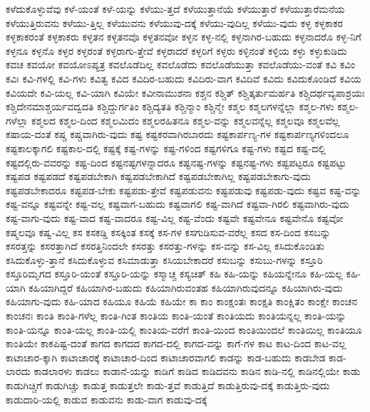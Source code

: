 {ಕಳೆದುಕೊಳ್ಳುವೆವು
ಕಳೆ-ಯಂತೆ
ಕಳೆ-ಯನ್ನು
ಕಳೆಯು-ತ್ತದೆ
ಕಳೆಯುತ್ತಾನೆಯೆ
ಕಳೆಯುತ್ತಾರೆ
ಕಳೆಯುತ್ತಾರೆಮನೆಯ
ಕಳೆಯುತ್ತಿರುವನು
ಕಳೆಯು-ತ್ತಿಲ್ಲ
ಕಳೆಯುವನು
ಕಳೆಯುವು-ದಕ್ಕೆ
ಕಳೆಯು-ವುದಿಲ್ಲ
ಕಳೆಯು-ವುದು
ಕಳ್ಳ
ಕಳ್ಳಕಾಕರ
ಕಳ್ಳಕಾಕರಂತೆ
ಕಳ್ಳಕಾಕರು
ಕಳ್ಳತನ
ಕಳ್ಳತನವೊ
ಕಳ್ಳತನವೋ
ಕಳ್ಳನ
ಕಳ್ಳ-ನಲ್ಲಿ
ಕಳ್ಳನಾಗಿರ-ಬಹುದು
ಕಳ್ಳನಾದರೊ
ಕಳ್ಳ-ನಿಗೆ
ಕಳ್ಳನೂ
ಕಳ್ಳನೊ
ಕಳ್ಳರ
ಕಳ್ಳರಂತೆ
ಕಳ್ಳರಾಗು-ತ್ತೇವೆ
ಕಳ್ಳರಾದರೆ
ಕಳ್ಳರಿಗೆ
ಕಳ್ಳರು
ಕಳ್ಳಿನಂತೆ
ಕಳ್ಳಿಯ
ಕಳ್ಳು
ಕಳ್ಳುಕುಡಿದು
ಕವಚ
ಕವಯೋ
ಕವಯೋಽಪ್ಯತ್ರ
ಕವಲೊಡೆದಿಲ್ಲ
ಕವಲೊಡೆದು
ಕವಲೊಡೆಯುತ್ತಾ
ಕವಲೊಡೆಯು-ವಂತೆ
ಕವಿ
ಕವಿಂ
ಕವಿಃ
ಕವಿ-ಗಳಲ್ಲಿ
ಕವಿ-ಗಳು
ಕವಿತ್ವ
ಕವಿದ
ಕವಿದಿರ-ಬಹುದು
ಕವಿದಿರು-ವಾಗ
ಕವಿದಿವೆ
ಕವಿದು
ಕವಿದುಕೊಂಡಿದೆ
ಕವಿಯ
ಕವಿಯದೇ
ಕವಿ-ಯಲ್ಲ
ಕವಿ-ಯಾಗಿ
ಕವಿಯೇ
ಕವೀನಾಮುಶನಾ
ಕಶ್ಚನ
ಕಶ್ಚಿತ್
ಕಶ್ಚಿತ್ಕರ್ತುಮರ್ಹತಿ
ಕಶ್ಚಿದರ್ಥವ್ಯಪಾಶ್ರಯಃ
ಕಶ್ಚಿದೇನಮಾಶ್ಚರ್ಯವದ್ವದತಿ
ಕಶ್ಚಿದ್ದುರ್ಗತಿಂ
ಕಶ್ಚಿದ್ಯತತಿ
ಕಶ್ಚಿನ್ಮಾಂ
ಕಶ್ಚಿನ್ಮೇ
ಕಶ್ಮಲ
ಕಶ್ಮಲಗಳನ್ನೆಲ್ಲಾ
ಕಶ್ಮಲ-ಗಳು
ಕಶ್ಮಲ-ಗಳೆಲ್ಲಾ
ಕಶ್ಮಲದ
ಕಶ್ಮಲ-ದಿಂದ
ಕಶ್ಮಲಮಿದಂ
ಕಶ್ಮಲರಹಿತನೂ
ಕಶ್ಮಲ-ವನ್ನು
ಕಶ್ಮಲವನ್ನೆಲ್ಲ
ಕಶ್ಮಲವೂ
ಕಶ್ಮಲವೆಲ್ಲ
ಕಷಾಯ-ದಂತೆ
ಕಷ್ಚ
ಕಷ್ಚವಾಗಿರು-ವುದು
ಕಷ್ಟ
ಕಷ್ಟಕರವಾಗಿರಬಾರದು
ಕಷ್ಟಕಾರ್ಪಣ್ಯ-ಗಳ
ಕಷ್ಟಕಾರ್ಪಣ್ಯಗಳಿಂದಲೂ
ಕಷ್ಟಕಾಲಕ್ಕಾಗಲಿ
ಕಷ್ಟಕಾಲ-ದಲ್ಲಿ
ಕಷ್ಟಕ್ಕೆ
ಕಷ್ಟ-ಗಳನ್ನು
ಕಷ್ಟ-ಗಳಿಂದ
ಕಷ್ಟಗಳಿಗೂ
ಕಷ್ಟ-ಗಳು
ಕಷ್ಟದ
ಕಷ್ಟ-ದಲ್ಲಿ
ಕಷ್ಟದಲ್ಲಿರು-ವವರನ್ನು
ಕಷ್ಟ-ದಿಂದ
ಕಷ್ಟನಷ್ಟಗಳನ್ನಾದರೂ
ಕಷ್ಟನಷ್ಟ-ಗಳನ್ನು
ಕಷ್ಟನಷ್ಟ-ಗಳು
ಕಷ್ಟಪಟ್ಟರೂ
ಕಷ್ಟಪಟ್ಟು
ಕಷ್ಟಪಡ
ಕಷ್ಟಪಡದೆ
ಕಷ್ಟಪಡಬೇಕಾಗಿ
ಕಷ್ಟಪಡಬೇಕಾಗಿದೆ
ಕಷ್ಟಪಡಬೇಕಾಗಿಲ್ಲ
ಕಷ್ಟಪಡಬೇಕಾಗು-ವುದು
ಕಷ್ಟಪಡಬೇಕಾದರೂ
ಕಷ್ಟಪಡ-ಬೇಕು
ಕಷ್ಟಪಡು-ತ್ತೇವೆ
ಕಷ್ಟಪಡುವನು
ಕಷ್ಟಪಡುವು
ಕಷ್ಟಪಡು-ವುದು
ಕಷ್ಟವ
ಕಷ್ಟ-ವನ್ನು
ಕಷ್ಟ-ವನ್ನೂ
ಕಷ್ಟವನ್ನೇ
ಕಷ್ಟ-ವಲ್ಲ
ಕಷ್ಟವಾಗ-ಬಹುದು
ಕಷ್ಟವಾಗಲಿ
ಕಷ್ಟ-ವಾಗಿದೆ
ಕಷ್ಟವಾ-ಗಿರಲಿ
ಕಷ್ಟವಾಗಿರು-ವುದು
ಕಷ್ಟ-ವಾಗು-ವುದು
ಕಷ್ಟ-ವಾದ
ಕಷ್ಟ-ವಾದರೂ
ಕಷ್ಟ-ವಿಲ್ಲ
ಕಷ್ಟ-ವೆಂದು
ಕಷ್ಟವೇ
ಕಷ್ಟವೇನೂ
ಕಷ್ಟವೇನೊ
ಕಷ್ಟವೋ
ಕಷ್ಮಲವೂ
ಕಷ್ವ-ವಿಲ್ಲ
ಕಸ
ಕಸಕಡ್ಡಿ
ಕಸಕ್ಕಿಂತ
ಕಸಕ್ಕೆ
ಕಸ-ಗಳ
ಕಸಗುಡಿಸುವ-ವರೆಲ್ಲ
ಕಸದ
ಕಸ-ದಿಂದ
ಕಸಬನ್ನು
ಕಸರತ್ತನ್ನು
ಕಸರತ್ತಾಗಿದೆ
ಕಸರತ್ತಿನಿಂದಲೇ
ಕಸರತ್ತು
ಕಸರತ್ತು-ಗಳನ್ನು
ಕಸ-ವನ್ನು
ಕಸ-ವಿಲ್ಲ
ಕಸಿದುಕೊಂಡಿತು
ಕಸಿದುಕೊಳ್ಳು-ತ್ತಾನೆ
ಕಸಿದುಕೊಳ್ಳುವ
ಕಸಿಮಾಡುತ್ತಾ
ಕಸಿಯಬೇಕಾದರೆ
ಕಸುಬನ್ನು
ಕಸುಬು-ಗಳನ್ನು
ಕಸ್ತೂರಿ
ಕಸ್ತೂರಿಮೃಗದ
ಕಸ್ತೂರಿ-ಯಂತೆ
ಕಸ್ತೂರಿ-ಯನ್ನು
ಕಸ್ಮಾಚ್ಚ
ಕಸ್ಯಚಿತ್
ಕಹಿ
ಕಹಿ-ಯನ್ನು
ಕಹಿಯನ್ನೇನೂ
ಕಹಿ-ಯಲ್ಲ
ಕಹಿ-ಯಾಗಿ
ಕಹಿಯಾಗಿದ್ದರೆ
ಕಹಿಯಾಗಿರ-ಬಹುದು
ಕಹಿಯಾಗಿರುವಂತಹ
ಕಹಿಯಾಗಿರುವುದನ್ನೂ
ಕಹಿಯಾಗಿರು-ವುದು
ಕಹಿಯಾಗು-ವುದು
ಕಹಿ-ಯಾದ
ಕಹಿಯೂ
ಕಹಿಯೆ
ಕಹಿಯೇ
ಕಾ
ಕಾಂ
ಕಾಂಕ್ಷಂತಃ
ಕಾಂಕ್ಷತಿ
ಕಾಂಕ್ಷಿತಂ
ಕಾಂಕ್ಷೇ
ಕಾಂಚನ
ಕಾಂಚನಃ
ಕಾಂತಿ
ಕಾಂತಿ-ಗಳೆಲ್ಲ
ಕಾಂತಿ-ಗಿಂತ
ಕಾಂತಿಯ
ಕಾಂತಿ-ಯಂತೆ
ಕಾಂತಿಯದು
ಕಾಂತಿಯನ್ನಲ್ಲ
ಕಾಂತಿ-ಯನ್ನು
ಕಾಂತಿ-ಯನ್ನೂ
ಕಾಂತಿ-ಯಲ್ಲ
ಕಾಂತಿ-ಯಲ್ಲಿ
ಕಾಂತಿಯ-ವರೆಗೆ
ಕಾಂತಿ-ಯಿಂದ
ಕಾಂತಿಯಿಂದಲೆ
ಕಾಂತಿಯಿಲ್ಲ
ಕಾಂತಿಯೂ
ಕಾಂತಿಯೇ
ಕಾಕಪಿಷ್ಟ-ದಂತೆ
ಕಾಗದ
ಕಾಗದದ
ಕಾಗದ-ದಲ್ಲಿ
ಕಾಗದ-ವನ್ನು
ಕಾಗೆ-ಗಳ
ಕಾಟ
ಕಾಟ-ದಿಂದ
ಕಾಟ-ವಲ್ಲ
ಕಾಟಾಚಾರ-ಕ್ಕಾಗಿ
ಕಾಟಾಚಾರಕ್ಕೆ
ಕಾಟಾಚಾರ-ದಿಂದ
ಕಾಟಾಚಾರವಾಗಲಿ
ಕಾಡನ್ನು
ಕಾಡ-ಬಹುದು
ಕಾಡಬೇಡ
ಕಾಡ-ಲಾರದು
ಕಾಡಲಾರಳು
ಕಾಡಲು
ಕಾಡಾನೆ-ಯನ್ನು
ಕಾಡಿಗೆ
ಕಾಡಿದ
ಕಾಡಿದವನು
ಕಾಡಿನ
ಕಾಡಿ-ನಲ್ಲಿ
ಕಾಡಿನಲ್ಲಿಯೇ
ಕಾಡು
ಕಾಡುಗಿಚ್ಚಿಗೆ
ಕಾಡುಗಿಚ್ಚು
ಕಾಡುತ್ತ
ಕಾಡುತ್ತಲೇ
ಕಾಡು-ತ್ತವೆ
ಕಾಡುತ್ತಿದೆ
ಕಾಡುತ್ತಿರುವು-ದಕ್ಕೆ
ಕಾಡುತ್ತಿರು-ವುದು
ಕಾಡುದಾರಿ-ಯಲ್ಲಿ
ಕಾಡುವ
ಕಾಡುವನು
ಕಾಡು-ವಾಗ
ಕಾಡುವು-ದಕ್ಕೆ
}
